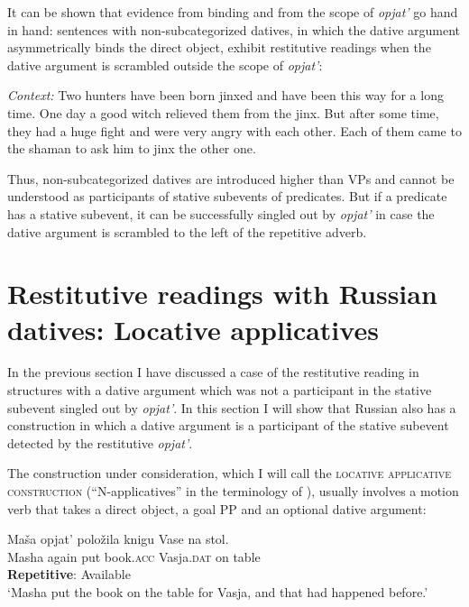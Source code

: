 \documentclass[output=paper]{langscibook}
\begin{document}
\noindent It can be shown that evidence from binding and from the scope of \textit{opjat’} go hand in hand: sentences with non-subcategorized datives, in which the dative argument asymmetrically binds the direct object, exhibit restitutive readings when the dative argument is scrambled outside the scope of \textit{opjat’}:


 \ea\label{ex:bondarenko:35}
\textit{Context:} Two hunters have been born jinxed and have been this way for a long time. One day a good witch relieved them from the jinx. But after some time, they had a huge fight and were very angry with each other. Each of them came to the shaman to ask him to jinx the other one.
\z


\noindent Thus, non-subcategorized datives are introduced higher than VPs and cannot be understood as participants of stative subevents of predicates. But if a predicate has a stative subevent, it can be successfully singled out by \textit{opjat’} in case the dative argument is scrambled to the left of the repetitive adverb.


\section{Restitutive readings with Russian datives: Locative applicatives}\label{s5}

In the previous section I have discussed a case of the restitutive reading in structures with a dative argument which was not a participant in the stative subevent singled out by \textit{opjat’}. In this section I will show that Russian also has a construction in which a dative argument is a participant of the stative subevent detected by the restitutive \textit{opjat’}.



The construction under consideration, which I will call the \textsc{locative applicative construction} (“N-applicatives” in the terminology of \citealt{Pshekhotskaya2012}), usually involves a motion verb that takes a direct object, a goal PP and an optional dative argument:\largerpage


 \ea\label{ex:bondarenko:36}
\gll Maša opjat’ položila knigu Vase na stol.\\
     Masha again put book.\textsc{acc} Vasja.\textsc{dat} on table\\
\ea \textbf{Repetitive}: Available\\
`Masha put the book on the table for Vasja, and that had   happened before.'
\end{document}
